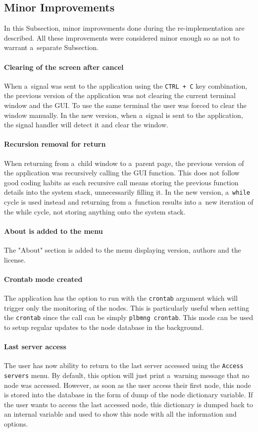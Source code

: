 {{{{{{\subsection{Minor Improvements}
In this Subsection, minor improvements done during the re-implementation are described. All these improvements were considered minor enough so as not to warrant a~separate Subsection.
\paragraph{Clearing of the screen after cancel}
When a~signal was sent to the application using the \texttt{CTRL + C} key combination, the previous version of the application was not clearing the current terminal window and the GUI. To use the same terminal the user was forced to clear the window manually. In the new version, when a~signal is sent to the application, the signal handler will detect it and clear the window.
\paragraph{Recursion removal for return}
When returning from a~child window to a~parent page, the previous version of the application was recursively calling the GUI function. This does not follow good coding habits as each recursive call means storing the previous function details into the system stack, unnecessarily filling it. In the new version, a~\texttt{while} cycle is used instead and returning from a~function results into a~new iteration of the while cycle, not storing anything onto the system stack. 
\paragraph{About is added to the menu}
The "About" section is added to the menu displaying version, authors and the license.
\paragraph{Crontab mode created}
The application has the option to run with the \texttt{crontab} argument which will trigger only the monitoring of the nodes. This is particularly useful when setting the \texttt{crontab} since the call can be simply \texttt{plbmng crontab}. This mode can be used to setup regular updates to the node database in the background.
\paragraph{Last server access}
The user has now ability to return to the last server accessed using the \texttt{Access servers} menu. By default, this option will just print a~warning message that no node was accessed. However, as soon as the user access their first node, this node is stored into the database in the form of dump of the node dictionary variable. If the user wants to access the last accessed node, this dictionary is dumped back to an internal variable and used to show this node with all the information and options.
}}}}}}
